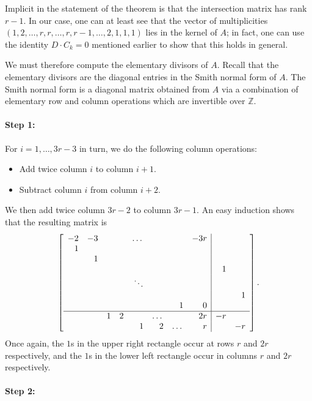 \documentclass[reqno]{amsart}
\theoremstyle{definition}
\theoremstyle{remark}
\def\Z{\mathbb{Z}}
\begin{document}
Implicit in the statement of the theorem is that the intersection matrix has rank $r-1$. In our case, one can at least see that the vector of multiplicities $(1,2,\dots,r,r,\dots,r,r-1,\dots,2,1,1,1)$ lies in the kernel of $A$; in fact, one can use the identity $D \cdot C_k = 0$ mentioned earlier to show that this holds in general.

We must therefore compute the elementary divisors of $A$. Recall that the elementary divisors are the diagonal entries in the Smith normal form of $A$. The Smith normal form is a diagonal matrix obtained from $A$ via a combination of elementary row and column operations which are invertible over $\Z$.

\paragraph{Step 1:}
\label{sec:step-1}

For $i = 1, \dots, 3r-3$ in turn, we do the following column operations:
\begin{itemize}
    \item Add twice column $i$ to column $i+1$.
    \item Subtract column $i$ from column $i+2$.
\end{itemize}
We then add twice column $3r-2$ to column $3r-1$. An easy induction shows that the resulting matrix is
\[
\left[\begin{array}{rrrrrrrr|rr}
  -2 & -3 & & & \dots & & & -3r & & \\
  1 & & & & & & & & & \\
  & 1 & & & & & & & & \\
  & & & & & & & & 1 & \\
  & & & & \ddots & & & & & \\
  & & & & & & & & & 1 \\
  & & & & & & 1 & 0 & & \\ \hline
  & & 1 & 2 & & \dots & & 2r & -r & \\
  & & & & 1 & 2 & \dots & r & & -r
\end{array}\right].
\]
Once again, the $1$s in the upper right rectangle occur at rows $r$ and $2r$ respectively, and the $1$s in the lower left rectangle occur in columns $r$ and $2r$ respectively.

\paragraph{Step 2:}
\label{sec:step-2}
\end{document}
